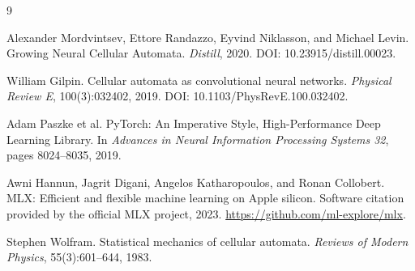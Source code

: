 \documentclass[11pt]{article}
\begin{document}
\begin{thebibliography}{9}

Alexander Mordvintsev, Ettore Randazzo, Eyvind Niklasson, and Michael Levin.
\newblock Growing Neural Cellular Automata.
\newblock \emph{Distill}, 2020.
\newblock DOI: 10.23915/distill.00023.

William Gilpin.
\newblock Cellular automata as convolutional neural networks.
\newblock \emph{Physical Review E}, 100(3):032402, 2019.
\newblock DOI: 10.1103/PhysRevE.100.032402.

Adam Paszke et al.
\newblock PyTorch: An Imperative Style, High-Performance Deep Learning Library.
\newblock In \emph{Advances in Neural Information Processing Systems 32}, pages 8024--8035, 2019.

Awni Hannun, Jagrit Digani, Angelos Katharopoulos, and Ronan Collobert.
\newblock MLX: Efficient and flexible machine learning on Apple silicon.
\newblock Software citation provided by the official MLX project, 2023.
\newblock \url{https://github.com/ml-explore/mlx}.

Stephen Wolfram.
\newblock Statistical mechanics of cellular automata.
\newblock \emph{Reviews of Modern Physics}, 55(3):601--644, 1983.

\end{thebibliography}
\end{document}
